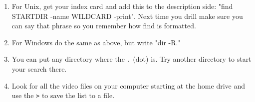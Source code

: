 \begin{enumerate}
\item For Unix, get your  index card and add this to the description side: "find STARTDIR -name WILDCARD -print".  Next time you drill make sure you can say that phrase so you remember how find is formatted.
\item For Windows do the same as above, but write "dir -R."
\item You can put any directory where the \verb|.| (dot) is.  Try another directory to start your search there.
\item Look for all the video files on your computer starting at the home drive and use the \verb|>| to save the list to a file.
\end{enumerate}

